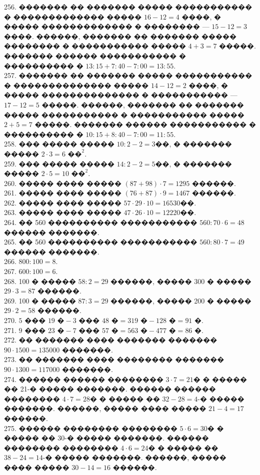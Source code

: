 \documentclass[12pt]{article}
\begin{document}
256. ������� �� ������� ����� ����������� � ������������� ����� $16-12=4$ ����, � ����� ������������� � �������� --- $15-12=3$ ����. ������, ������� �� ������� ����� �������� � ����������� ����� $4+3=7$ �����. ������� ������ ����������� � ���������� � $13:15+7:40-7:00=13:55.$\\
257. ������� �� ������� ����� ����������� � �������������� ����� $14-12=2$ ����, � ����� �������������� � ����������� --- $17-12=5$ �����. ������, ������� �� ������� ����� ����������� � ����������� ����� $2+5=7$ �����. ������� ������ ����������� � ���������� � $10:15+8:40-7:00=11:55.$\\
258. ��� ����� ����� $10:2-2=3$��, � ������� ����� $2\cdot3=6\text{ ��}^2.$\\
259. ��� ����� ����� $14:2-2=5$��, � ������� ����� $2\cdot5=10\text{ ��}^2.$\\
260. ����� ���� ����� $(87+98)\cdot7=1295$ ������.\\
261. ����� ���� ����� $(76+87)\cdot9=1467$ ������.\\
262. ����� ���� ����� $57\cdot29\cdot10=16530$��.\\
263. ����� ���� ����� $47\cdot26\cdot10=12220$��.\\
264. �� 560 ���������� ����������� $560:70\cdot6=48$ ������ �������.\\
265. �� 560 ���������� ����������� $560:80\cdot7=49$ ������ �������.\\
266. $800:100=8.$\\
267. $600:100=6.$\\
268. 100 � ����� $58:2=29$ ������, ����� 300 � ����� $29\cdot3=87$ ������.\\
269. 100 � ����� $87:3=29$ ������, ����� 200 � ����� $29\cdot2=58$ ������.\\
270. $5\text{ ��� }19\text{ �}- 3\text{ ��� }48\text{ �}=319\text{ �}-128\text{ �}=91\text{ �}.$\\
271. $9\text{ ��� }23\text{ �}- 7\text{ ��� }57\text{ �}=563\text{ �}-477\text{ �}=86\text{ �}.$\\
272. �� ������� ���� ������� ������� $90\cdot1500=135000$ �������.\\
273. �� ������� ���� �������� ������� $90\cdot1300=117000$ �������.\\
274. ������ ������ �������� $3\cdot7=21$� � ����� �� 21-� ����� �������. ������ ������ �������� $4\cdot7=28$� � ����� �� $32-28=4$-� ����� �������. ������, ����� ���� ����� $21-4=17$ ������.\\
275. ������ �������� �������� $5\cdot6=30$� � ����� �� 30-� ����� �������. ������ �������� �������� $4\cdot6=24$� � ����� �� $38-24=14$-� ����� �������. ������, ����� ���� ����� $30-14=16$ ������.\\
\end{document}
